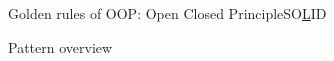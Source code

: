 \begin{frame}{Golden rules of OOP: Open Closed Principle}{SO\underline  LID}
	
\end{frame}

\begin{frame}{Pattern overview}
	
\end{frame}